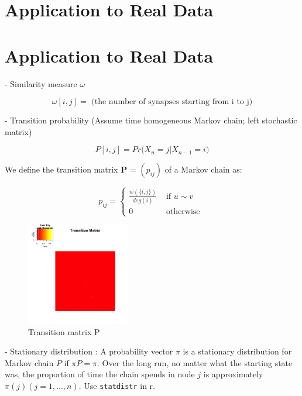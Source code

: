\documentclass[12pt]{report}
\begin{document}
\newpage
\section{Application to Real Data}




\section{Application to Real Data}

- Similarity measure $\omega$

$$\omega[i,j] = \mbox{ (the number of synapses starting from i to j)}$$
 

- Transition probability (Assume time homogeneous Markov chain; left stochastic matrix)

$$P[i,j] = Pr\big( X_{n} = j  | X_{n-1} = i \big)$$

We define the transition matrix \textbf{P} = $(p_{ij})$ of a Markov chain as:

$$p_{ij} = \left\{ \begin{array}{ll} \frac{w(\{ i, j\})}{ deg(i) } & \mbox{ if } u \sim v \\ 0 & \mbox{ otherwise }  \end{array}  \right.$$


\begin{figure}[H]
\captionsetup{format=plain}
\centering
\includegraphics[width=0.4\textwidth]{../figure/trans.png}
\caption{Transition matrix P}
\label{fig:trans}
\end{figure}



- Stationary distribution 
: A probability vector $\pi$ is a stationary distribution for Markov chain $P$ if $\pi P = \pi$. Over the long run, no matter what the starting state was, the proportion of time the chain spends in node $j$ is approximately $\pi(j) (j = 1, ... , n)$.
Use \verb!statdistr! in r.
\end{document}
